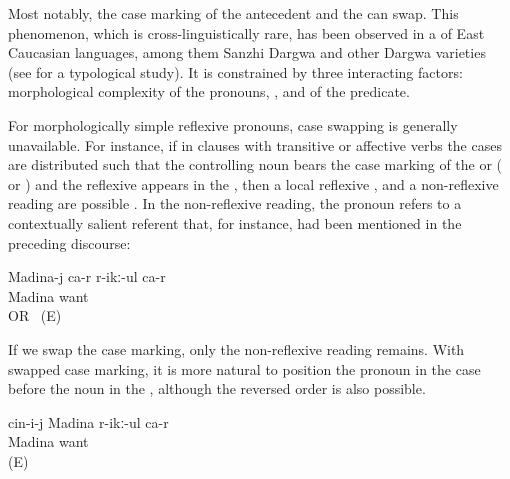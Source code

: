 Most notably, the case marking of the antecedent and the  can swap. This phenomenon, which is cross-linguistically rare, has been observed in a  of East Caucasian languages, among them Sanzhi Dargwa and other Dargwa varieties (see \citealp{Forker2014} for a typological study). It is constrained by three interacting factors: morphological complexity of the pronouns, , and  of the predicate.

For morphologically simple reflexive pronouns, case swapping is generally unavailable. For instance, if in clauses with transitive or affective verbs the cases are distributed such that the controlling noun bears the case marking of the  or  ( or ) and the reflexive appears in the , then a local reflexive ,  and a non-reflexive reading are possible . In the non-reflexive reading, the pronoun refers to a contextually salient referent that, for instance, had been mentioned in the preceding discourse:

\begin{exe}
	\ex	\label{ex:Madina likes / wants / loves herself. OR Madina likes / wants / loves her}
	\gll	Madina-j ca-r	r-ikː-ul	ca-r\\
		Madina		want	\\
	\glt	{} OR ~(E)
\end{exe}

If we swap the case marking, only the non-reflexive reading remains. With swapped case marking, it is more natural to position the pronoun in the  case before the noun in the  , although the reversed order is also possible.

\begin{exe}
	\ex	\label{ex:She likes / wants / loves Madina}
	\gll	cin-i-j	Madina r-ikː-ul	ca-r\\
			Madina want	\\
	\glt	{} (E)
\end{exe}

